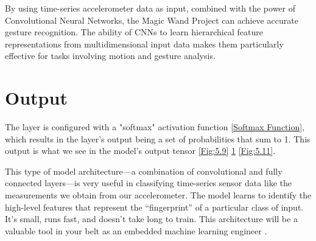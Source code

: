 By using time-series accelerometer data as input, combined with the power of Convolutional Neural Networks, the Magic Wand Project can achieve accurate gesture recognition. The ability of CNNs to learn hierarchical feature representations from multidimensional input data makes them particularly effective for tasks involving motion and gesture analysis.

\section{Output}

The layer is configured with a "softmax" activation function \ref{Softmax Function}, which results in the layer’s output being a set of probabilities that sum to 1. This output is what we see in the model’s output tensor \ref{Fig:5.9} \ref{Fig:5.10} \ref{Fig:5.11}.

This type of model architecture—a combination of convolutional and fully connected layers—is very useful in classifying time-series sensor data like the measurements we obtain from our accelerometer. The model learns to identify the high-level features that represent the “fingerprint” of a particular class of input. It’s small, runs fast, and doesn’t take long to train. This architecture will be a valuable tool in your belt as an embedded machine learning engineer \cite{Warden:2020}.

\begin{center}
	\label{Fig:5.9}
\end{center}

\begin{figure}[H]\centering
	\label{Fig:5.10}
\end{figure}

